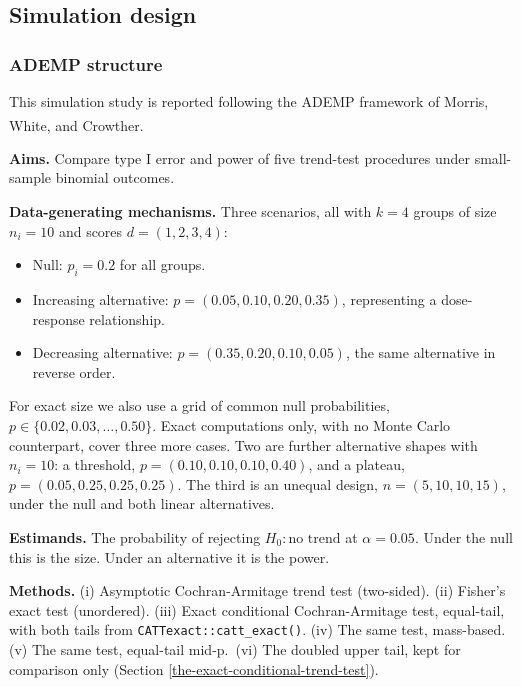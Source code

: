 \documentclass[
  11pt,
]{article}
\providecommand{\tightlist}{%
  \setlength{\itemsep}{0pt}\setlength{\parskip}{0pt}}
\begin{document}
\subsection{Simulation design}\label{simulation-design}

\subsubsection{ADEMP structure}\label{ademp-structure}

This simulation study is reported following the ADEMP framework of
Morris, White, and Crowther\textsuperscript{}.

\textbf{Aims.} Compare type I error and power of five trend-test
procedures under small-sample binomial outcomes.

\textbf{Data-generating mechanisms.} Three scenarios, all with
\(k = 4\) groups of size \(n_i = 10\) and scores
\(d = (1, 2, 3, 4)\):

\begin{itemize}
\tightlist
\item
  Null: \(p_i = 0.2\) for all groups.
\item
  Increasing alternative: \(p = (0.05, 0.10, 0.20, 0.35)\),
  representing a dose-response relationship.
\item
  Decreasing alternative: \(p = (0.35, 0.20, 0.10, 0.05)\),
  the same alternative in reverse order.
\end{itemize}

For exact size we also use a grid of common null
probabilities, \(p \in \{0.02, 0.03, \ldots, 0.50\}\). Exact
computations only, with no Monte Carlo counterpart, cover
three more cases. Two are further alternative shapes with
\(n_i = 10\): a threshold, \(p = (0.10, 0.10, 0.10, 0.40)\),
and a plateau, \(p = (0.05, 0.25, 0.25, 0.25)\). The third
is an unequal design, \(n = (5, 10, 10, 15)\), under the
null and both linear alternatives.

\textbf{Estimands.} The probability of rejecting
\(H_0: \text{no trend}\) at \(\alpha = 0.05\). Under the null
this is the size. Under an alternative it is the power.

\textbf{Methods.} (i) Asymptotic Cochran-Armitage trend test
(two-sided). (ii) Fisher's exact test (unordered).
(iii) Exact conditional Cochran-Armitage test, equal-tail,
with both tails from \texttt{CATTexact::catt\_exact()}. (iv) The
same test, mass-based. (v) The same test, equal-tail
mid-p.~(vi) The doubled upper tail, kept for comparison
only (Section \ref{the-exact-conditional-trend-test}).
\end{document}
